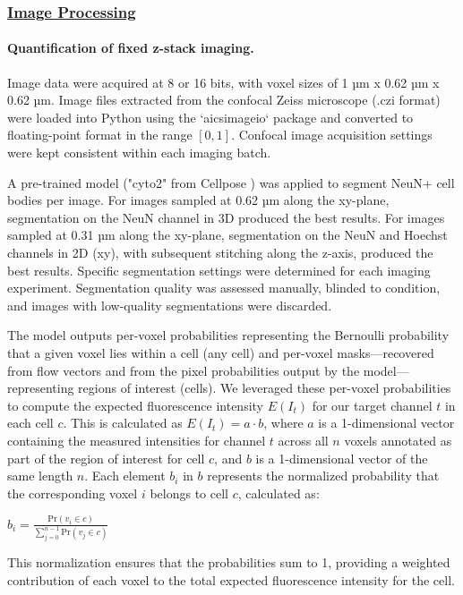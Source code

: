 \subsubsection{\underline{Image Processing}}

\paragraph{Quantification of fixed z-stack imaging.}
Image data were acquired at 8 or 16 bits, with voxel sizes of 1 µm x 0.62 µm x 0.62 µm. Image files extracted from the confocal Zeiss microscope (.czi format) were loaded into Python using the `aicsimageio` package and converted to floating-point format in the range $[0,1]$. Confocal image acquisition settings were kept consistent within each imaging batch.

A pre-trained model ("cyto2" from Cellpose \cite{Stringer2021-yn}) was applied to segment NeuN+ cell bodies per image. For images sampled at 0.62 µm along the xy-plane, segmentation on the NeuN channel in 3D produced the best results. For images sampled at 0.31 µm along the xy-plane, segmentation on the NeuN and Hoechst channels in 2D (xy), with subsequent stitching along the z-axis, produced the best results. Specific segmentation settings were determined for each imaging experiment. Segmentation quality was assessed manually, blinded to condition, and images with low-quality segmentations were discarded.

The model outputs per-voxel probabilities representing the Bernoulli probability that a given voxel lies within a cell (any cell) and per-voxel masks—recovered from flow vectors and from the pixel probabilities output by the model—representing regions of interest (cells). We leveraged these per-voxel probabilities to compute the expected fluorescence intensity $E(I_t)$ for our target channel $t$ in each cell $c$. This is calculated as $E(I_t) = a \cdot b$, where $a$ is a 1-dimensional vector containing the measured intensities for channel $t$ across all $n$ voxels annotated as part of the region of interest for cell $c$, and $b$ is a 1-dimensional vector of the same length $n$. Each element $b_i$ in $b$ represents the normalized probability that the corresponding voxel $i$ belongs to cell $c$, calculated as:

$b_i = \frac{\text{Pr}(v_i \in c)}{\sum_{j=0}^{n-1} \text{Pr}(v_j \in c)}$

This normalization ensures that the probabilities sum to 1, providing a weighted contribution of each voxel to the total expected fluorescence intensity for the cell.

